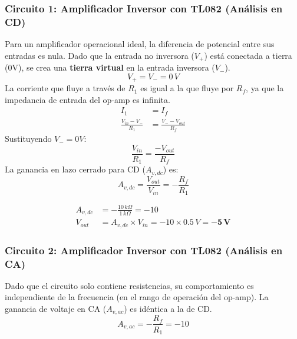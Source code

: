 \documentclass[11pt]{scrartcl}
\begin{document}
\subsubsection{Circuito 1: Amplificador Inversor con TL082 (Análisis en CD)}

Para un amplificador operacional ideal, la diferencia de potencial entre sus entradas es nula. Dado que la entrada no inversora ($V_+$) está conectada a tierra (0V), se crea una \textbf{tierra virtual} en la entrada inversora ($V_-$).
\begin{equation}
    V_+ = V_- = 0 \, V
\end{equation}
La corriente que fluye a través de $R_1$ es igual a la que fluye por $R_f$, ya que la impedancia de entrada del op-amp es infinita.
\begin{align*}
    I_1 &= I_f \\
    \frac{V_{in} - V_-}{R_1} &= \frac{V_- - V_{out}}{R_f}
\end{align*}
Sustituyendo $V_- = 0V$:
\begin{equation}
    \frac{V_{in}}{R_1} = \frac{-V_{out}}{R_f}
\end{equation}
La ganancia en lazo cerrado para CD ($A_{v,dc}$) es:
\begin{equation}
    A_{v,dc} = \frac{V_{out}}{V_{in}} = -\frac{R_f}{R_1}
\end{equation}


\begin{align*}
    A_{v,dc} &= -\frac{10 \, k\Omega}{1 \, k\Omega} = -10 \\
    V_{out} &= A_{v,dc} \times V_{in} = -10 \times 0.5 \, V = \mathbf{-5 \, V}
\end{align*}


\subsubsection{Circuito 2: Amplificador Inversor con TL082 (Análisis en CA)}

Dado que el circuito solo contiene resistencias, su comportamiento es independiente de la frecuencia (en el rango de operación del op-amp). La ganancia de voltaje en CA ($A_{v,ac}$) es idéntica a la de CD.
\begin{equation}
    A_{v,ac} = -\frac{R_f}{R_1} = -10
\end{equation}
\end{document}
